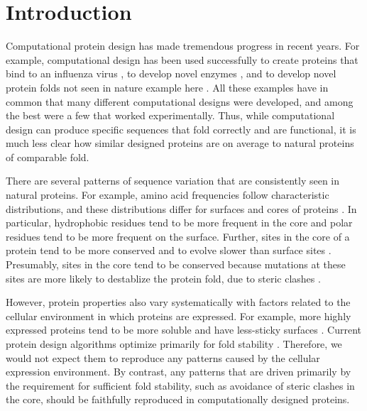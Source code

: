 \documentclass[12pt]{article}
\begin{document}
\section{Introduction}
\label{Introduction}

Computational protein design has made tremendous progress in recent years. For example, computational design has been used successfully to create proteins that bind to an influenza virus \citep{Fleishman2011}, to develop novel enzymes \citep{Rothlisberger2008}, and to develop novel protein folds not seen in nature example here \citep{Kuhlman2003}. All these examples have in common that many different computational designs were developed, and among the best were a few that worked experimentally. Thus, while computational design can produce specific sequences that fold correctly and are functional, it is much less clear how similar designed proteins are on average to natural proteins of comparable fold.

There are several patterns of sequence variation that are consistently seen in natural proteins. For example, amino acid frequencies follow characteristic distributions, and these distributions differ for surfaces and cores of proteins \citep{Overington1992,Porto2004,Bastolla2005,Moelbertetal2004}. In particular, hydrophobic residues tend to be more frequent in the core and polar residues tend to be more frequent on the surface. Further, sites in the core of a protein tend to be more conserved and to evolve slower than surface sites \citep{MirnyShakhnovich1999,Goldman1998,Bustamante2000,Conant2009,Franzosa2009,Ramsey2011,Scherreretal2012,MeyerWilke2012}. Presumably, sites in the core tend to be conserved because mutations at these sites are more likely to destablize the protein fold, due to steric clashes \citep{ChothiaFinkelstein1990}.

However, protein properties also vary systematically with factors related to the cellular environment in which proteins are expressed. For example, more highly expressed proteins tend to be more soluble and have less-sticky surfaces \citep{Tartagliaetal2007,Levyetal2012}. Current protein design algorithms optimize primarily for fold stability \citep{Butterfoss2006, Das2008}. Therefore, we would not expect them to reproduce any patterns caused by the cellular expression environment. By contrast, any patterns that are driven primarily by the requirement for sufficient fold stability, such as avoidance of steric clashes in the core, should be faithfully reproduced in computationally designed proteins.
\end{document}
